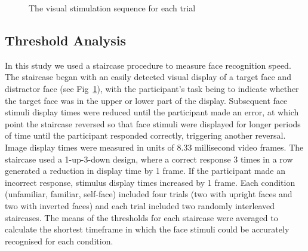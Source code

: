\documentclass[
  10pt,
  letterpaper,
]{article}
\begin{document}
\begin{figure}


\caption{\label{fig-procedure}The visual stimulation sequence for each
trial}

\end{figure}%

\subsection{Threshold Analysis}\label{threshold-analysis}

In this study we used a staircase procedure to measure face recognition
speed. The staircase began with an easily detected visual display of a
target face and distractor face (see Fig~\ref{fig-procedure}), with the
participant's task being to indicate whether the target face was in the
upper or lower part of the display. Subsequent face stimuli display
times were reduced until the participant made an error, at which point
the staircase reversed so that face stimuli were displayed for longer
periods of time until the participant responded correctly, triggering
another reversal. Image display times were measured in units of 8.33
millisecond video frames. The staircase used a 1-up-3-down design, where
a correct response 3 times in a row generated a reduction in display
time by 1 frame. If the participant made an incorrect response, stimulus
display times increased by 1 frame. Each condition (unfamiliar,
familiar, self-face) included four trials (two with upright faces and
two with inverted faces) and each trial included two randomly
interleaved staircases. The means of the thresholds for each staircase
were averaged to calculate the shortest timeframe in which the face
stimuli could be accurately recognised for each condition.
\end{document}
